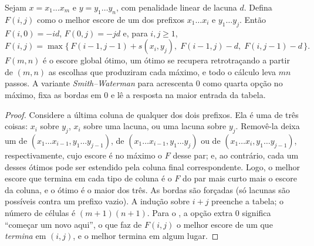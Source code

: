 \begin{theorem}\label{thm:b3:bioinformatics:nw}
Sejam $x = x_{1}\dots x_{m}$ e $y = y_{1}\dots y_{n}$, com penalidade
linear de lacuna $d$. Defina $F(i,j)$ como o melhor escore de um
 dos prefixos $x_{1}\dots x_{i}$ e $y_{1}\dots y_{j}$. Então $F(i,0) = -id$, $F(0,j) = -jd$ e, para $i,j \ge 1$,
\[
F(i,j) = \max\bigl\{\,F(i-1,j-1) + s(x_{i},y_{j}),\;
F(i-1,j) - d,\; F(i,j-1) - d\,\bigr\}.
\]
$F(m,n)$ é o escore global ótimo, um  ótimo se recupera
retrotraçando a partir de $(m,n)$ as escolhas que produziram cada
máximo, e todo o cálculo leva $mn$ passos. A variante
\emph{Smith--Waterman} para  acrescenta $0$ como
quarta opção no máximo, fixa as bordas em $0$ e lê a resposta na maior
entrada da tabela.
\end{theorem}
\begin{proof}
Considere a última coluna de qualquer  dos dois prefixos.
Ela é uma de três coisas: $x_{i}$ sobre $y_{j}$, $x_{i}$ sobre uma
lacuna, ou uma lacuna sobre $y_{j}$. Removê-la deixa um  de
$(x_{1}\dots x_{i-1},
y_{1}\dots y_{j-1})$, de $(x_{1}\dots x_{i-1}, y_{1}\dots y_{j})$ ou de $(x_{1}\dots x_{i}, y_{1}\dots y_{j-1})$,
respectivamente, cujo escore é no máximo o $F$ desse par; e, ao
contrário, cada um desses  ótimos pode ser estendido pela
coluna final correspondente. Logo, o melhor escore que termina em cada
tipo de coluna é o $F$ do par mais curto mais o escore da coluna, e o
ótimo é o maior dos três. As bordas são forçadas (só lacunas são
possíveis contra um prefixo vazio). A indução sobre $i + j$ preenche a
tabela; o número de células é $(m+1)(n+1)$. Para o , a
opção extra $0$ significa ``começar um novo  aqui'', o que
faz de $F(i,j)$ o melhor escore de um  que \emph{termina}
em $(i,j)$, e o melhor  termina em algum lugar.
\end{proof}

